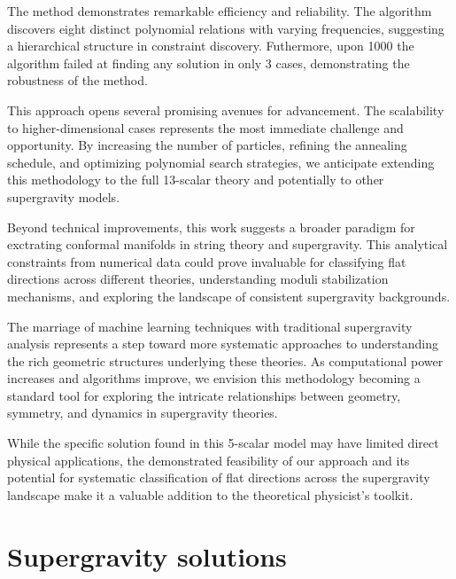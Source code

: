 \documentclass[11pt]{article}
\begin{document}
The method demonstrates remarkable efficiency and reliability. The algorithm discovers eight distinct polynomial relations with varying frequencies, suggesting a hierarchical structure in constraint discovery. Futhermore, upon 1000 the algorithm failed at finding any solution in only 3 cases, demonstrating the robustness of the method. 

This approach opens several promising avenues for advancement. The scalability to higher-dimensional cases represents the most immediate challenge and opportunity. By increasing the number of particles, refining the annealing schedule, and optimizing polynomial search strategies, we anticipate extending this methodology to the full 13-scalar theory and potentially to other supergravity models. 

Beyond technical improvements, this work suggests a broader paradigm for exctrating conformal manifolds in string theory and supergravity. This analytical constraints from numerical data could prove invaluable for classifying flat directions across different theories, understanding moduli stabilization mechanisms, and exploring the landscape of consistent supergravity backgrounds.

The marriage of machine learning techniques with traditional supergravity analysis represents a step toward more systematic approaches to understanding the rich geometric structures underlying these theories. As computational power increases and algorithms improve, we envision this methodology becoming a standard tool for exploring the intricate relationships between geometry, symmetry, and dynamics in supergravity theories.

While the specific solution found in this 5-scalar model may have limited direct physical applications, the demonstrated feasibility of our approach and its potential for systematic classification of flat directions across the supergravity landscape make it a valuable addition to the theoretical physicist's toolkit.

\appendix
\section{Supergravity solutions}
\end{document}
